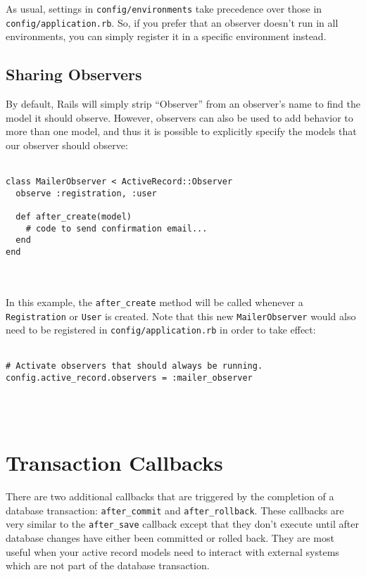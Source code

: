 \documentclass[10pt]{book}
\begin{document}
As usual, settings in \texttt{config/environments} take precedence over those in \texttt{config/application.rb}.  So, if you prefer that an observer doesn’t run in all environments, you  can simply register it in a specific environment instead.

\subsection{ Sharing Observers}

By default, Rails will simply strip “Observer” from an observer’s  name to find the model it should observe. However, observers can also be  used to add behavior to more than one model, and thus it is possible to  explicitly specify the models that our observer should observe:
\\ \\
\begin{minipage}{\textwidth}{\scriptsize
\begin{verbatim}
class MailerObserver < ActiveRecord::Observer
  observe :registration, :user
 
  def after_create(model)
    # code to send confirmation email...
  end
end
\end{verbatim}}
\end{minipage}
\\ \\

In this example, the \texttt{after\_create} method will be called whenever a \texttt{Registration} or \texttt{User} is created. Note that this new \texttt{MailerObserver} would also need to be registered in \texttt{config/application.rb} in order to take effect:
\\ \\
\begin{minipage}{\textwidth}{\scriptsize
\begin{verbatim}
# Activate observers that should always be running.
config.active_record.observers = :mailer_observer
\end{verbatim}}
\end{minipage}
\\ \\

\section{ Transaction Callbacks}

There are two additional callbacks that are triggered by the completion of a database transaction: \texttt{after\_commit} and \texttt{after\_rollback}. These callbacks are very similar to the \texttt{after\_save}  callback except that they don’t execute until after database changes  have either been committed or rolled back. They are most useful when  your active record models need to interact with external systems which  are not part of the database transaction.
\end{document}
